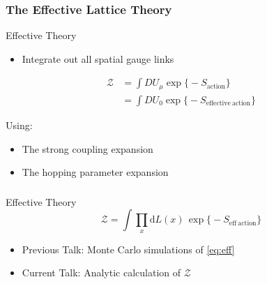 \documentclass[12pt,a4paper,dvipsnames,usenames,handout]{beamer}
\begin{document}
\begin{frame}
  \frametitle{The Effective Lattice Theory}

  \begin{alertblock}{Effective Theory}
    \begin{itemize}
      \item \color{LightUIBase} Integrate out all spatial gauge links
    \end{itemize}
    \begin{align*}
      \mathcal{Z} &= \int D U_{\mu} \exp\big\{ \minus S_{\mathrm{action}} \big\} \\
      &= \int D U_0 \exp\big\{ \minus S_{\mathrm{effective \: action}} \big\}
    \end{align*}
  \end{alertblock}

  \vspace{1em}

  {\color{LightUIRed}Using:}
  \begin{itemize}
    \item The strong coupling expansion
    \item The hopping parameter expansion
  \end{itemize}

\end{frame}

\begin{frame}
  \frametitle{}

  \begin{block}{Effective Theory}
    \begin{equation} \tag{$\dagger$} \label{eq:eff}
      \mathcal{Z} = \int \prod_x \mathrm{d} L(x) \, \exp \big\{ \minus S_{\mathrm{eff \: action}} \big\}
    \end{equation}
  \end{block}

  \vspace{1em}

  \begin{itemize} \setlength\itemsep{2em}
    \item Previous Talk: Monte Carlo simulations of \eqref{eq:eff}
    \item Current Talk: Analytic calculation of $\mathcal{Z}$
  \end{itemize}

\end{frame}
\end{document}
